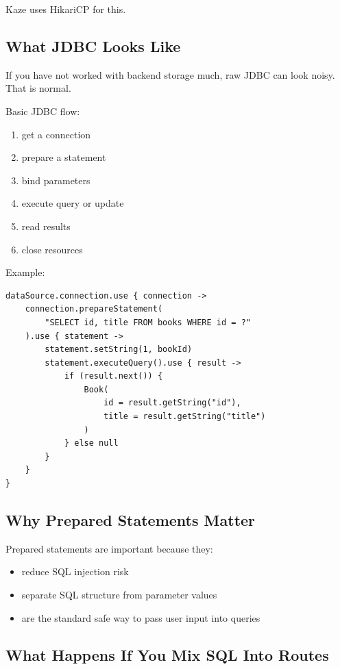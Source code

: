 \documentclass[11pt,a4paper]{article}
\begin{document}
Kaze uses HikariCP for this.

\subsection{What JDBC Looks Like}

If you have not worked with backend storage much, raw JDBC can look noisy. That is normal.

Basic JDBC flow:
\begin{enumerate}
    \item get a connection
    \item prepare a statement
    \item bind parameters
    \item execute query or update
    \item read results
    \item close resources
\end{enumerate}

Example:

\begin{lstlisting}[style=kazekotlin]
dataSource.connection.use { connection ->
    connection.prepareStatement(
        "SELECT id, title FROM books WHERE id = ?"
    ).use { statement ->
        statement.setString(1, bookId)
        statement.executeQuery().use { result ->
            if (result.next()) {
                Book(
                    id = result.getString("id"),
                    title = result.getString("title")
                )
            } else null
        }
    }
}
\end{lstlisting}

\subsection{Why Prepared Statements Matter}

Prepared statements are important because they:
\begin{itemize}
    \item reduce SQL injection risk
    \item separate SQL structure from parameter values
    \item are the standard safe way to pass user input into queries
\end{itemize}

\subsection{What Happens If You Mix SQL Into Routes}
\end{document}
